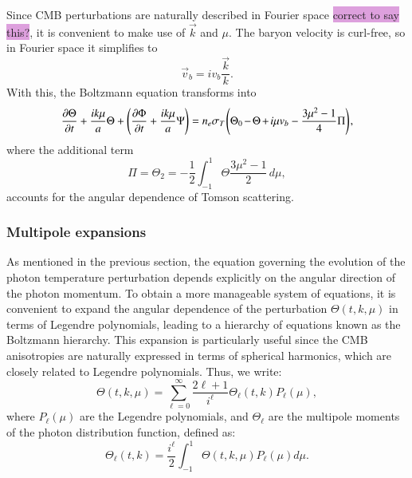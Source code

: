 \documentclass{aa}
\numberwithin{equation}{section}
\numberwithin{table}{section}
\numberwithin{figure}{section}
\begin{document}
Since CMB perturbations are naturally described in Fourier space \colorbox{Plum}{correct to say this?}, it is convenient to make use of $\vec{k}$ and $\mu$. The baryon velocity is curl-free, so in Fourier space it simplifies to 
\begin{equation} 
  \vec{v}_b = iv_b \frac{\vec{k}}{k}. 
\end{equation} 
With this, the Boltzmann equation transforms into
\begin{equation} 
  \frac{\partial \Theta}{\partial t} + \frac{ik\mu}{a} \Theta + \left(\frac{\partial\Phi}{\partial t} + \frac{ik\mu}{a} \Psi \right) = n_e\sigma_T \hspace{-1pt}\left(\Theta_0 \hspace{-1pt}-\hspace{-1pt} \Theta \hspace{-1pt}+ \hspace{-1pt}i\mu v_b - \frac{3\mu^2 - 1}{4} \Pi \right)\hspace{-1pt}, \label{eq: Boltzmann photons Fourier}
\end{equation} 
where the additional term 
\begin{equation}
  \Pi = \Theta_2 = -\frac{1}{2}\int_{-1}^{1}\Theta \frac{3\mu^2-1}{2}\,d\mu, \label{eq: Pi}
\end{equation}
accounts for the angular dependence of Tomson scattering. 


\subsubsection{Multipole expansions}

As mentioned in the previous section, the equation governing the evolution of the photon temperature perturbation depends explicitly on the angular direction of the photon momentum. To obtain a more manageable system of equations, it is convenient to expand the angular dependence of the perturbation $\Theta(t, k, \mu)$ in terms of Legendre polynomials, leading to a hierarchy of equations known as the Boltzmann hierarchy. This expansion is particularly useful since the CMB anisotropies are naturally expressed in terms of spherical harmonics, which are closely related to Legendre polynomials. Thus, we write:
\begin{equation} 
  \Theta(t, k, \mu) = \sum_{\ell=0}^{\infty} \frac{2\ell+1}{i^\ell} \Theta_\ell(t, k) P_\ell(\mu), 
\end{equation}
where $P_\ell(\mu)$ are the Legendre polynomials, and $\Theta_\ell$ are the multipole moments of the photon distribution function, defined as:
\begin{equation} 
  \Theta_\ell(t, k) = \frac{i^\ell}{2} \int_{-1}^{1} \Theta(t, k, \mu) P_\ell(\mu) d\mu. 
\end{equation}
\end{document}
